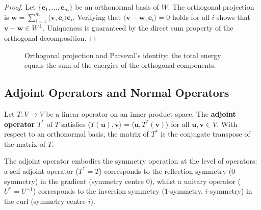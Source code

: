 \begin{proof}
Let $\{\mathbf{e}_1, \dots, \mathbf{e}_m\}$ be an orthonormal basis of $W$. The orthogonal projection is $\mathbf{w} = \sum_{i=1}^m \langle \mathbf{v}, \mathbf{e}_i \rangle \mathbf{e}_i$. Verifying that $\langle \mathbf{v} - \mathbf{w}, \mathbf{e}_i \rangle = 0$ holds for all $i$ shows that $\mathbf{v} - \mathbf{w} \in W^\perp$. Uniqueness is guaranteed by the direct sum property of the orthogonal decomposition.
\end{proof}

\begin{figure}[htbp]
\centering
{}
\caption{Orthogonal projection and Parseval's identity: the total energy equals the sum of the energies of the orthogonal components.}
\label{fig:orthogonal_projection}
\end{figure}

\subsection{\texorpdfstring{Adjoint Operators and Normal Operators}{Adjoint Operators and Normal Operators}}

\begin{definition}\label{def:adjoint}
Let $T: V \to V$ be a linear operator on an inner product space. The \textbf{adjoint operator} $T^*$ of $T$ satisfies $\langle T(\mathbf{u}), \mathbf{v} \rangle = \langle \mathbf{u}, T^*(\mathbf{v}) \rangle$ for all $\mathbf{u}, \mathbf{v} \in V$. With respect to an orthonormal basis, the matrix of $T^*$ is the conjugate transpose of the matrix of $T$.

The adjoint operator embodies the symmetry operation at the level of operators: a self-adjoint operator ($T^* = T$) corresponds to the reflection symmetry ($0$-symmetry) in the gradient (symmetry centre $0$), whilst a unitary operator ($U^* = U^{-1}$) corresponds to the inversion symmetry ($1$-symmetry, $i$-symmetry) in the curl (symmetry centre $i$).
\end{definition}

